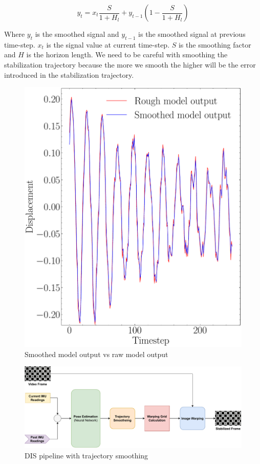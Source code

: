 \begin{equation}
    y_t = x_t  \frac{S}{1+H_l} + y_{t-1}(1 - \frac{S}{1+H_l})
    \label{eqn:emaf}
\end{equation}

Where $ y_t $ is the smoothed signal and $ y_{t-1} $ is the smoothed signal at previous time-step. $ x_t $ is the signal value at current time-step. $ S $ is the smoothing factor and $ H $ is the horizon length. We need to be careful with smoothing the stabilization trajectory because the more we smooth the higher will be the error introduced in the stabilization trajectory.


\begin{figure}[H]
    \centering
    \includegraphics[scale=0.3]{images/fig_chapter4/nn_related/rough_mo_smooth_mo.pdf}
    \caption{Smoothed model output vs raw model output}
    \label{fig:rough_mo_smooth_mo}
\end{figure}

\begin{figure}[H]
    \centering
    \includegraphics[scale=0.55]{images/fig_chapter4/dis_smooth_pipeline.pdf}
    \caption{DIS pipeline with trajectory smoothing}
    \label{fig:dis_smooth_pipeline}
\end{figure}




